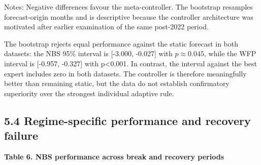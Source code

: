 Notes: Negative differences favour the meta-controller. The bootstrap
resamples forecast-origin months and is descriptive because the
controller architecture was motivated after earlier examination of the
same post-2022 period.

The bootstrap rejects equal performance against the static forecast in
both datasets: the NBS 95\% interval is {[}-3.000, -0.027{]} with
\(p\approx 0.045\), while the WFP interval is {[}-0.957, -0.327{]} with
p\textless0.001. In contrast, the interval against the best expert
includes zero in both datasets. The controller is therefore meaningfully
better than remaining static, but the data do not establish confirmatory
superiority over the strongest individual adaptive rule.

\subsection{5.4 Regime-specific performance and recovery
failure}\label{regime-specific-performance-and-recovery-failure}

\textbf{Table 6. NBS performance across break and recovery periods}

